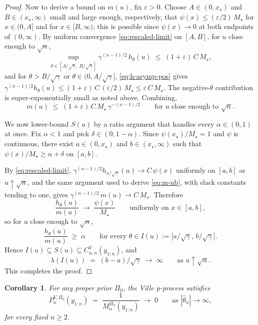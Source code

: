 \documentclass[numsec,webpdf,modern,medium,namedate]{oup-authoring-template}
\theoremstyle{thmstyleone}%
\theoremstyle{thmstyletwo}%
\theoremstyle{thmstylethree}%
\newtheorem{corollary}[theorem]{Corollary}
\newcommand{\1}{\mathbf{1}}
\begin{document}
\begin{proof}
Now to derive a bound on $m(u)$, fix $\varepsilon > 0$. Choose $A \in (0, x_\star)$
and $B \in (x_\star, \infty)$ small and large enough, respectively, that
$\psi(x) \leq (\varepsilon/2)\, M_\star$ for $x \in (0, A]$ and for $x \in [B,\infty)$;
this is possible since $\psi(x) \to 0$ at both endpoints of $(0,\infty)$.
By uniform convergence \eqref{eq:rescaled-limit} on $[A,B]$, for $u$ close
enough to $\sqrt n$,
\begin{equation}\label{eq:on-compact-ub}
  \sup_{\theta \in [A/\sqrt\gamma,\,B/\sqrt\gamma]}
    \gamma^{(n-1)/2}\,h_\theta(u)
  \;\leq\; (1+\varepsilon)\,C\,M_\star,
\end{equation}
and for $\theta > B/\sqrt\gamma$ or $\theta \in (0, A/\sqrt\gamma]$,
\eqref{eq:h-asymp-pos} gives
$\gamma^{(n-1)/2} h_\theta(u) \leq (1+\varepsilon)\, C\, (\varepsilon/2)\, M_\star
 \leq \varepsilon\, C\, M_\star$.
The negative-$\theta$ contribution is super-exponentially small as noted
above. Combining,
\begin{equation}\label{eq:m-ub}
  m(u) \;\leq\; (1+\varepsilon)\,C\,M_\star\,\gamma^{-(n-1)/2}
  \qquad \text{for } u \text{ close enough to } \sqrt n.
\end{equation}

We now lower-bound $S(u)$ by a ratio argument that handles every
$\alpha \in (0,1)$ at once. Fix $\alpha < 1$ and pick
$\delta \in (0, 1-\alpha)$. Since $\psi(x_\star)/M_\star = 1$ and $\psi$
is continuous, there exist $a \in (0, x_\star)$ and $b \in (x_\star, \infty)$
such that $\psi(x)/M_\star \geq \alpha + \delta$ on $[a,b]$.

By \eqref{eq:rescaled-limit}, $\gamma^{(n-1)/2} h_{x/\sqrt\gamma}(u) \to C\,\psi(x)$
uniformly on $[a,b]$ as $u\uparrow\sqrt n$, and the same argument used to
derive \eqref{eq:m-ub}, with slack constants tending to one, gives
$\gamma^{(n-1)/2}\,m(u) \to C\,M_\star$. Therefore
\[
   \frac{h_\theta(u)}{m(u)}
   \;\longrightarrow\;\frac{\psi(x)}{M_\star}
   \qquad\text{uniformly on } x \in [a,b],
\]
so for $u$ close enough to $\sqrt n$,
\[
   \frac{h_\theta(u)}{m(u)} \;\geq\; \alpha
   \qquad\text{for every } \theta \in I(u) := \bigl[a/\sqrt\gamma,\, b/\sqrt\gamma\bigr].
\]
Hence $I(u) \subseteq S(u) \subseteq C_{\alpha,n}^V(y_{1:n})$, and
\[
   \lambda(I(u)) \;=\; (b-a)/\sqrt\gamma \;\longrightarrow\;\infty
   \qquad\text{as } u\uparrow\sqrt n.
\]
This completes the proof.
\end{proof}

\begin{corollary}\label{cor:Ville-pdegen}
For any proper prior \(\Pi_0\), the Ville p-process satisfies
\[
  P_n^{V,\Pi_0}(y_{1:n})\;=\;\frac{1}{M_n^{\Pi_0}(y_{1:n})}
  \;\longrightarrow\;0\qquad\text{as }|\widehat\theta_n|\to\infty,
\]
for every fixed \(n\geq 2\).
\end{corollary}
\end{document}
